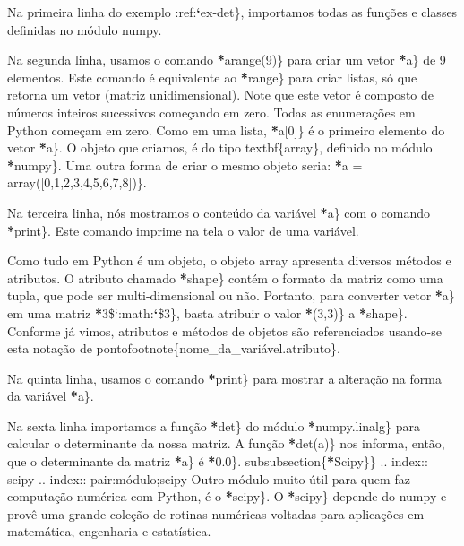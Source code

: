 \documentclass[a4paper,10pt,portuguese]{sphinxmanual}
\begin{document}
Na primeira linha do exemplo :ref:{\color{red}\bfseries{}{}`}ex-det\}, importamos todas as funções e classes definidas no módulo numpy.

Na segunda linha, usamos o comando {\color{red}\bfseries{}*}arange(9)\} para criar um vetor {\color{red}\bfseries{}*}a\}  de 9 elementos. Este comando é equivalente ao {\color{red}\bfseries{}*}range\} para criar listas, só que retorna um vetor (matriz unidimensional). Note que este vetor é composto de números inteiros sucessivos começando em zero. Todas as enumerações em Python começam em zero. Como em uma lista, {\color{red}\bfseries{}*}a{[}0{]}\} é o primeiro elemento do vetor {\color{red}\bfseries{}*}a\}. O objeto que criamos, é do tipo textbf\{array\}, definido no módulo {\color{red}\bfseries{}*}numpy\}. Uma outra forma de criar o mesmo objeto seria:
{\color{red}\bfseries{}*}a = array({[}0,1,2,3,4,5,6,7,8{]})\}.

Na terceira linha, nós mostramos o conteúdo da variável {\color{red}\bfseries{}*}a\} com o comando {\color{red}\bfseries{}*}print\}. Este comando imprime na tela o valor de uma variável.

Como tudo em Python é um objeto, o objeto array apresenta diversos métodos e atributos. O atributo chamado {\color{red}\bfseries{}*}shape\} contém o formato da matriz como uma tupla, que pode ser multi-dimensional ou não. Portanto, para converter vetor {\color{red}\bfseries{}*}a\} em uma matriz {\color{red}\bfseries{}*}3\${}`:math:{\color{red}\bfseries{}{}`}\$3\}, basta atribuir o valor {\color{red}\bfseries{}*}(3,3)\} a {\color{red}\bfseries{}*}shape\}. Conforme já vimos, atributos e métodos de objetos são referenciados usando-se esta notação de pontofootnote\{nome\_da\_variável.atributo\}.

Na quinta linha, usamos o comando {\color{red}\bfseries{}*}print\} para mostrar a alteração na forma da variável {\color{red}\bfseries{}*}a\}.

Na sexta linha importamos a função {\color{red}\bfseries{}*}det\} do módulo {\color{red}\bfseries{}*}numpy.linalg\} para calcular o determinante da nossa matriz. A função {\color{red}\bfseries{}*}det(a)\} nos informa, então, que o determinante da matriz {\color{red}\bfseries{}*}a\} é {\color{red}\bfseries{}*}0.0\}.
subsubsection\{{\color{red}\bfseries{}*}Scipy\}\}
.. index:: scipy
.. index:: pair:módulo;scipy
Outro módulo muito útil para quem faz computação numérica com Python, é o {\color{red}\bfseries{}*}scipy\}. O {\color{red}\bfseries{}*}scipy\} depende do numpy e provê uma grande coleção de rotinas numéricas voltadas para aplicações em matemática, engenharia e estatística.
\end{document}
